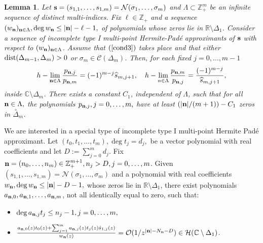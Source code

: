 \documentclass[10pt,a4paper]{article}
\newtheorem{lemma}[theorem]{Lemma}
\theoremstyle{definition}
\theoremstyle{remark}
\numberwithin{equation}{section}
\begin{document}
\begin{lemma} \label{CCTI}  Let ${\bf s}= (s_{1,1},\ldots,s_{1,m}) = \mathcal{N}(\sigma_1,\ldots,\sigma_m)$ and $\Lambda \subset \mathbb{Z}_+^{m}$ be an infinite sequence of distinct multi-indices. Fix  $\ell \in \mathbb{Z}_+$ and a sequence $(w_{\bf n})_{{\bf n}\in \Lambda}, \deg w_{\bf n} \leq |{\bf n}|  - \ell -1,$  of polynomials  whose zeros lie in $\mathbb{R} \setminus\Delta_1$.  Consider a sequence of incomplete type I multi-point Hermite-Pad\'e approximants of ${\bf s}$ with respect to $(w_{\bf n})_{{\bf n} \in \Lambda}$.
Assume that $(\ref{cond3})$ takes place and that either $\mbox{\rm dist}(\Delta_{m-1},\Delta_m) >0$ or $\sigma_m \in \mathcal{C}(\Delta_m)$. Then,
for each fixed $j=0,\ldots,m-1$
\begin{equation} \label{convHaus}
h-\lim_{{\bf n}\in \Lambda}\frac{p_{{\bf n}, j}}{p_{{\bf n},m}} = (-1)^{m-j}\widehat{s}_{m,j+1}, \quad h-\lim_{n\in \Lambda}\frac{p_{{\bf n}, m}}{p_{{\bf n},j}} = \frac{(-1)^{m-j}}{\widehat{s}_{m,j+1} },
\end{equation}
inside $\mathbb{C} \setminus \Delta_m$.  There exists a constant $C_1$, independent of $\Lambda$, such that  for all ${\bf n} \in \Lambda,$ the polynomials $p_{{\bf n},j}, j=0,\ldots,m,$  have at least $(|{\bf n}|/(m+1)) - C_1$ zeros in $\stackrel{\circ}{\Delta}_m $.
\end{lemma}

We are interested in a special type of incomplete type I multi-point Hermite Pad\'e approximant.
Let $(t_0,t_{1},\ldots,t_{m}), \deg t_j = d_j,$ be a vector polynomial with real coefficients  and let $D:=\sum_{j=0}^{m}d_{j}$.
Fix  ${{\bf n}} = (n_0,\ldots,n_m) \in \mathbb{Z}_+^{m+1}, n_{j}>D, j=0,\ldots,m$. Given   $(s_{1,1},\ldots, s_{1,m})= \mathcal{N}(\sigma_{1},\dots, \sigma_{m})$ and a
polynomial with real coefficients $w_{{\bf n}}, \deg w_{{\bf n}} \leq |{{\bf n}}|-D-1,$  whose zeros lie in  $\mathbb{R}\setminus \Delta_{1}$, there exist polynomials $a_{{{\bf n}},0},a_{{{\bf n}},1}, \ldots, a_{{{\bf n}},m}$, not all identically equal to zero, such that:
\begin{itemize}
\item[a')] $\deg a_{{{\bf n}},j}t_{j} \leq n_j-1, j=0,\ldots,m,$
\item[b')] $\frac{a_{{{\bf n}},0}(z)t_0(z)+\sum_{j=1}^m a_{{{\bf n}},j}(z)  t_j(z)\hat{s}_{1,j}(z) }{w_{{\bf n}}(z)} = {\mathcal{O}}(1/z^{|{{\bf n}}|- N_{\bf n}-D}) \in \mathcal{H}(\mathbb{C}\setminus \Delta_{1})$.
\end{itemize}
\end{document}
